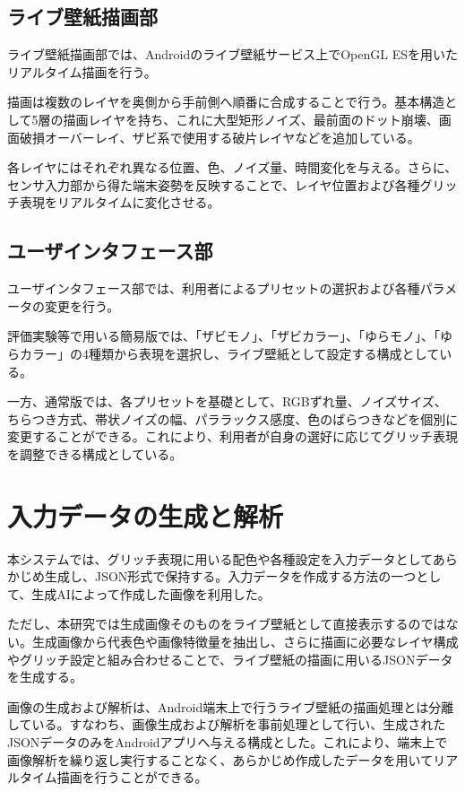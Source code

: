 \subsection{ライブ壁紙描画部}

ライブ壁紙描画部では、Androidのライブ壁紙サービス上でOpenGL ESを用いたリアルタイム描画を行う。

描画は複数のレイヤを奥側から手前側へ順番に合成することで行う。基本構造として5層の描画レイヤを持ち、これに大型矩形ノイズ、最前面のドット崩壊、画面破損オーバーレイ、ザビ系で使用する破片レイヤなどを追加している。

各レイヤにはそれぞれ異なる位置、色、ノイズ量、時間変化を与える。さらに、センサ入力部から得た端末姿勢を反映することで、レイヤ位置および各種グリッチ表現をリアルタイムに変化させる。


\subsection{ユーザインタフェース部}

ユーザインタフェース部では、利用者によるプリセットの選択および各種パラメータの変更を行う。

評価実験等で用いる簡易版では、「ザビモノ」、「ザビカラー」、「ゆらモノ」、「ゆらカラー」の4種類から表現を選択し、ライブ壁紙として設定する構成としている。

一方、通常版では、各プリセットを基礎として、RGBずれ量、ノイズサイズ、ちらつき方式、帯状ノイズの幅、パララックス感度、色のばらつきなどを個別に変更することができる。これにより、利用者が自身の選好に応じてグリッチ表現を調整できる構成としている。

\section{入力データの生成と解析}

本システムでは、グリッチ表現に用いる配色や各種設定を入力データとしてあらかじめ生成し、JSON形式で保持する。入力データを作成する方法の一つとして、生成AIによって作成した画像を利用した。

ただし、本研究では生成画像そのものをライブ壁紙として直接表示するのではない。生成画像から代表色や画像特徴量を抽出し、さらに描画に必要なレイヤ構成やグリッチ設定と組み合わせることで、ライブ壁紙の描画に用いるJSONデータを生成する。

画像の生成および解析は、Android端末上で行うライブ壁紙の描画処理とは分離している。すなわち、画像生成および解析を事前処理として行い、生成されたJSONデータのみをAndroidアプリへ与える構成とした。これにより、端末上で画像解析を繰り返し実行することなく、あらかじめ作成したデータを用いてリアルタイム描画を行うことができる。

